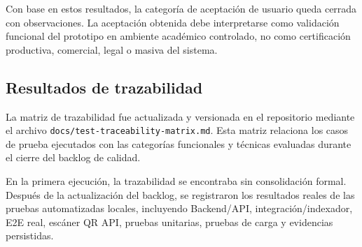 \documentclass[12pt,letterpaper]{article}
\begin{document}
Con base en estos resultados, la categoría de aceptación de usuario queda cerrada con observaciones. La aceptación obtenida debe interpretarse como validación funcional del prototipo en ambiente académico controlado, no como certificación productiva, comercial, legal o masiva del sistema.

\subsection{Resultados de trazabilidad}

La matriz de trazabilidad fue actualizada y versionada en el repositorio mediante el archivo \texttt{docs/test-traceability-matrix.md}. Esta matriz relaciona los casos de prueba ejecutados con las categorías funcionales y técnicas evaluadas durante el cierre del backlog de calidad.

En la primera ejecución, la trazabilidad se encontraba sin consolidación formal. Después de la actualización del backlog, se registraron los resultados reales de las pruebas automatizadas locales, incluyendo Backend/API, integración/indexador, E2E real, escáner QR API, pruebas unitarias, pruebas de carga y evidencias persistidas.
\end{document}
